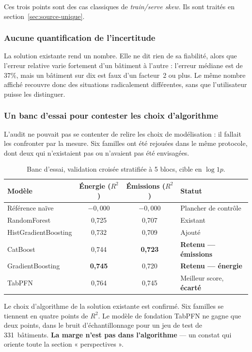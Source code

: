 Ces trois points sont des cas classiques de \emph{train/serve skew}. Ils sont
traités en section~\ref{sec:source-unique}.

\subsubsection{Aucune quantification de l'incertitude}

La solution existante rend un nombre. Elle ne dit rien de sa fiabilité, alors que
l'erreur relative varie fortement d'un bâtiment à l'autre : l'erreur médiane est
de $37\%$, mais un bâtiment sur dix est faux d'un facteur~2 ou plus. Le même
nombre affiché recouvre donc des situations radicalement différentes, sans que
l'utilisateur puisse les distinguer.

\subsubsection{Un banc d'essai pour contester les choix d'algorithme}

L'audit ne pouvait pas se contenter de relire les choix de modélisation : il
fallait les confronter par la mesure. Six familles ont été rejouées dans le même
protocole, dont deux qui n'existaient pas ou n'avaient pas été envisagées.

\begin{table}[H]
\centering
\small
\begin{tabular}{@{}lccl@{}}
\toprule
\textbf{Modèle} & \textbf{Énergie} ($R^2$) & \textbf{Émissions} ($R^2$) & \textbf{Statut} \\
\midrule
Référence naïve      & $-0{,}000$ & $-0{,}000$ & Plancher de contrôle \\
RandomForest         & 0,725 & 0,707 & Existant \\
HistGradientBoosting & 0,732 & 0,709 & Ajouté \\
CatBoost             & 0,744 & \textbf{0,723} & \textbf{Retenu — émissions} \\
GradientBoosting     & \textbf{0,745} & 0,720 & \textbf{Retenu — énergie} \\
TabPFN               & 0,764 & 0,745 & Meilleur score, \textbf{écarté} \\
\bottomrule
\end{tabular}
\caption{Banc d'essai, validation croisée stratifiée à 5 blocs, cible en $\log 1p$.}
\end{table}

\begin{constat}{Le choix d'algorithme de la solution existante est confirmé.}
Six familles se tiennent en quatre points de $R^2$. Le modèle de fondation TabPFN
ne gagne que deux points, dans le bruit d'échantillonnage pour un jeu de test de
331~bâtiments. \textbf{La marge n'est pas dans l'algorithme} — un constat qui
oriente toute la section « perspectives ».
\end{constat}

